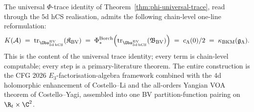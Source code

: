 The universal $\Phi$-trace identity of
Theorem~\ref{thm:phi-universal-trace}, read through the $5$d hCS
realisation, admits the following chain-level one-line
reformulation:
\begin{equation}
\label{eq:universal-trace-one-line}
  K(\mathcal{A}) \;=\; \mathrm{tr}_{\Obs^{\mathrm{BV}}_{5\mathrm{d\,hCS}}}(\mathfrak{K}_{\mathrm{BV}})
  \;=\; \Phi^{\mathrm{Borch}}_*\Bigl(\mathrm{tr}_{\Obs^{\mathrm{BV}}_{5\mathrm{d\,hCS}}}(\mathfrak{B}_{\mathrm{BV}})\Bigr)
  \;=\; c_\Lambda(0)/2
  \;=\; \kappa_{\mathrm{BKM}}(\mathfrak{g}_\Lambda).
\end{equation}
This is the content of the universal trace identity; every term is
chain-level computable; every step is a primary-literature theorem.
The entire construction is the CFG 2026 $E_3$-factorisation-algebra
framework combined with the $4$d holomorphic enhancement of
Costello--Li and the all-orders Yangian VOA theorem of
Costello--Yagi, assembled into one BV partition-function pairing on
$\R_t\times\C^2$.

